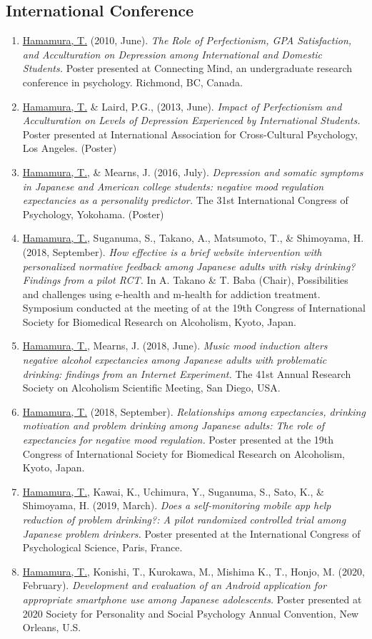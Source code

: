 \documentclass{article}
\begin{document}
\subsection{International Conference}
\begin{enumerate}
	\item \underline{Hamamura, T.} (2010, June). \textit{The Role of Perfectionism, GPA Satisfaction, and Acculturation on Depression among International and Domestic Students.} Poster presented at Connecting Mind, an undergraduate research conference in psychology. Richmond, BC, Canada.
	\item \underline{Hamamura, T.} \& Laird, P.G., (2013, June). \textit{Impact of Perfectionism and Acculturation on Levels of Depression Experienced by International Students.} Poster presented at International Association for Cross-Cultural Psychology, Los Angeles. (Poster)
	\item \underline{Hamamura, T.}, \& Mearns, J. (2016, July). \textit{Depression and somatic symptoms in Japanese and American college students: negative mood regulation expectancies as a personality predictor.} The 31st International Congress of Psychology, Yokohama. (Poster)
	\item \underline{Hamamura, T.}, Suganuma, S., Takano, A., Matsumoto, T., \& Shimoyama, H. (2018, September). \textit{How effective is a brief website intervention with personalized normative feedback among Japanese adults with risky drinking? Findings from a pilot RCT.} In A. Takano \& T. Baba (Chair), Possibilities and challenges using e-health and m-health for addiction treatment. Symposium conducted at the meeting of at the 19th Congress of International Society for Biomedical Research on Alcoholism, Kyoto, Japan.
	\item \underline{Hamamura, T.}, Mearns, J. (2018, June). \textit{Music mood induction alters negative alcohol expectancies among Japanese adults with problematic drinking: findings from an Internet Experiment.} The 41st Annual Research Society on Alcoholism Scientific Meeting, San Diego, USA.
	\item \underline{Hamamura, T.} (2018, September). \textit{Relationships among expectancies, drinking motivation and problem drinking among Japanese adults: The role of expectancies for negative mood regulation.} Poster presented at the 19th Congress of International Society for Biomedical Research on Alcoholism, Kyoto, Japan.
	\item \underline{Hamamura, T.}, Kawai, K., Uchimura, Y., Suganuma, S., Sato, K., \& Shimoyama, H. (2019, March). \textit{Does a self-monitoring mobile app help reduction of problem drinking?: A pilot randomized controlled trial among Japanese problem drinkers.} Poster presented at the International Congress of Psychological Science, Paris, France.
	\item \underline{Hamamura, T.}, Konishi, T., Kurokawa, M., Mishima K., T., Honjo, M. (2020, February). \textit{Development and evaluation of an Android application for appropriate smartphone use among Japanese adolescents.} Poster presented at 2020 Society for Personality and Social Psychology Annual Convention, New Orleans, U.S.
\end{enumerate}
\end{document}
